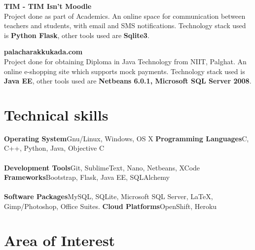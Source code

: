 \documentclass[11pt,a4paper,sans]{moderncv} %
\begin{document}
\cvlistitem
{\textbf{TIM - TIM Isn't Moodle}
  \\Project done as part of Academics. An online space for communication between teachers and students, with email and SMS notifications. Technology stack used is \textbf{Python Flask}, other tools used are \textbf{Sqlite3}. \\}
  
\cvlistitem
{\textbf{palacharakkukada.com}
  \\Project done for obtaining Diploma in Java Technology from NIIT, Palghat. An online e-shopping site which supports mock payments. Technology stack used is \textbf{Java EE}, other tools used are \textbf{Netbeans 6.0.1, Microsoft SQL Server 2008}. \\}



\section{Technical skills}

\cvcomputer
{\textbf{Operating System}}{Gnu/Linux, Windows, OS X}
{\textbf{Programming Languages}}{C, C++, Python, Java, Objective C}
~\\
~\\
\cvcomputer
{\textbf{Development Tools}}{Git, SublimeText, Nano, Netbeans, XCode}
{\textbf{Frameworks}}{Bootstrap, Flask, Java EE, SQLAlchemy}
~\\
~\\
\cvcomputer
{\textbf{Software Packages}}{MySQL, SQLite, Microsoft SQL Server, \LaTeX, Gimp/Photoshop, Office Suites.}
{\textbf{Cloud Platforms}}{OpenShift, Heroku}
{}{}




\section{Area of Interest}


\end{document}
